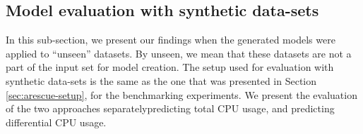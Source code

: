 




\subsection{Model evaluation with synthetic data-sets}
In this sub-section, we present our findings when the generated
models were applied to ``unseen'' datasets. 
By unseen, we mean that these datasets are not a part of the
input set for model creation.
The setup used for evaluation with synthetic 
data-sets is the same 
as the one that was presented in Section \ref{sec:arescue-setup}, 
for the benchmarking experiments.
We present the evaluation of the two approaches separately\textemdash{}predicting
total CPU usage, and predicting differential CPU usage.

